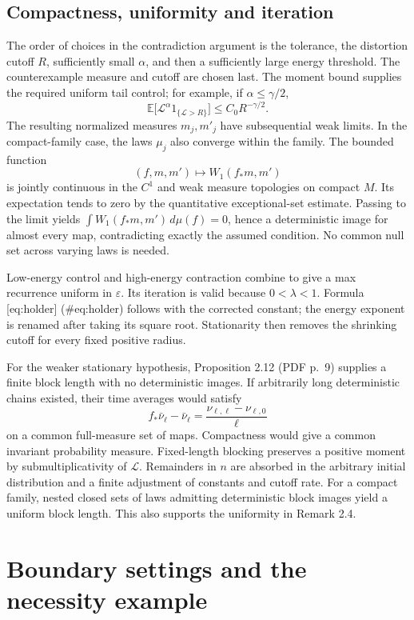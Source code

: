 \documentclass[10pt]{article}
\begin{document}
\subsection*{Compactness, uniformity and iteration}
The order of choices in the contradiction argument is the tolerance, the distortion cutoff \(R\), sufficiently small \(\alpha\), and then a sufficiently large energy threshold. The counterexample measure and cutoff are chosen last. The moment bound supplies the required uniform tail control; for example, if \(\alpha\le\gamma/2\), \[\mathbb E\big[\mathcal L^\alpha 1_{\{\mathcal L>R\}}\big]
 \le C_0R^{-\gamma/2}.\] The resulting normalized measures \(m_j,m'_j\) have subsequential weak limits. In the compact-family case, the laws \(\mu_j\) also converge within the family. The bounded function \[(f,m,m')\longmapsto W_1(f_*m,m')\] is jointly continuous in the \(C^1\) and weak measure topologies on compact \(M\). Its expectation tends to zero by the quantitative exceptional-set estimate. Passing to the limit yields \(\int W_1(f_*m,m')\,d\mu(f)=0\), hence a deterministic image for almost every map, contradicting exactly the assumed condition. No common null set across varying laws is needed.\par
Low-energy control and high-energy contraction combine to give a max recurrence uniform in \(\varepsilon\). Its iteration is valid because \(0<\lambda<1\). Formula [eq:holder] (\#eq:holder) follows with the corrected constant; the energy exponent is renamed after taking its square root. Stationarity then removes the shrinking cutoff for every fixed positive radius.\par
For the weaker stationary hypothesis, Proposition 2.12 (PDF p. 9) supplies a finite block length with no deterministic images. If arbitrarily long deterministic chains existed, their time averages would satisfy \[f_*\bar\nu_\ell-\bar\nu_\ell
 =\frac{\nu_{\ell,\ell}-\nu_{\ell,0}}{\ell}\] on a common full-measure set of maps. Compactness would give a common invariant probability measure. Fixed-length blocking preserves a positive moment by submultiplicativity of \(\mathcal L\). Remainders in \(n\) are absorbed in the arbitrary initial distribution and a finite adjustment of constants and cutoff rate. For a compact family, nested closed sets of laws admitting deterministic block images yield a uniform block length. This also supports the uniformity in Remark 2.4.\par
\section*{Boundary settings and the necessity example}
\end{document}
